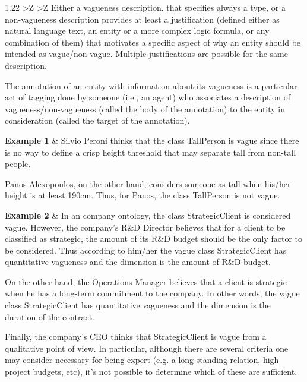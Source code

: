 \documentclass[runningheads,a4paper]{llncs}
\begin{document}
\begin{table}[h!]
{\begin{tabularx}{1.22\textwidth}{ >{\hsize}Z  >{\hsize}Z }
Either a vagueness description, that specifies always a type, or a non-vagueness description provides at least a justification (defined either as natural language text, an entity or a more complex logic formula, or any combination of them) that motivates a specific aspect of why an entity should be intended as vague/non-vague. Multiple justifications are possible for the same description.

The annotation of an entity with information about its vagueness is a particular act of tagging done by someone (i.e., an agent) who associates a description of vagueness/non-vagueness (called the body of the annotation) to the entity in consideration (called the target of the annotation). \\
 \midrule

{\bf Example 1} & Silvio Peroni thinks that the class TallPerson is vague since there is no way to define a crisp height threshold that may separate tall from non-tall people.

Panos Alexopoulos, on the other hand, considers someone as tall when his/her height is at least 190cm. Thus, for Panos, the class TallPerson is not vague. \\
 \midrule

{\bf Example 2} & In an company ontology, the class StrategicClient is considered vague. However, the company's R\&D Director believes that for a client to be classified as strategic, the amount of its R\&D budget should be the only factor to be considered. Thus according to him/her the vague class StrategicClient has quantitative vagueness and the dimension is the amount of R\&D budget.

On the other hand, the Operations Manager believes that a client is strategic when he has a long-term commitment to the company. In other words, the vague class StrategicClient has quantitative vagueness and the dimension is the duration of the contract.

Finally, the company's CEO thinks that StrategicClient is vague from a qualitative point of view. In particular, although there are several criteria one may consider necessary for being expert (e.g. a long-standing relation, high project budgets, etc), it's not possible to determine which of these are sufficient. \\
 \bottomrule

\end{tabularx}}

\label{refTable0}
\end{table}
\end{document}
